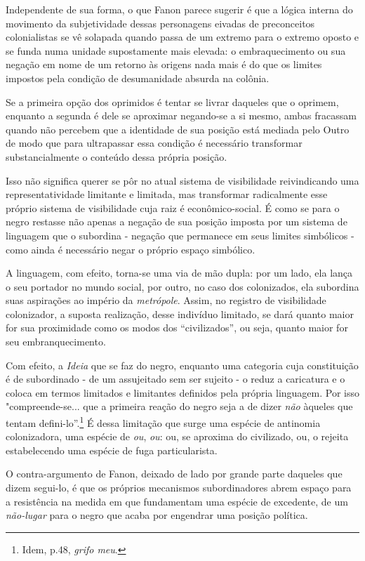 Independente de sua forma, o que Fanon parece sugerir é que a lógica
interna do movimento da subjetividade dessas personagens eivadas de
preconceitos colonialistas se vê solapada quando passa de um extremo
para o extremo oposto e se funda numa unidade supostamente mais elevada:
o embraquecimento ou sua negação em nome de um retorno às origens nada
mais é do que os limites impostos pela condição de desumanidade absurda
na colônia.

Se a primeira opção dos oprimidos é tentar se livrar daqueles que o
oprimem, enquanto a segunda é dele se aproximar negando-se a si mesmo,
ambas fracassam quando não percebem que a identidade de sua posição está
mediada pelo Outro de modo que para ultrapassar essa condição é
necessário transformar substancialmente o conteúdo dessa própria
posição.

Isso não significa querer se pôr no atual sistema de visibilidade
reivindicando uma representatividade limitante e limitada, mas
transformar radicalmente esse próprio sistema de visibilidade cuja raiz
é econômico-social. É como se para o negro restasse não apenas a negação
de sua posição imposta por um sistema de linguagem que o subordina -
negação que permanece em seus limites simbólicos - como ainda é
necessário negar o próprio espaço simbólico.

A linguagem, com efeito, torna-se uma via de mão dupla: por um lado, ela
lança o seu portador no mundo social, por outro, no caso dos
colonizados, ela subordina suas aspirações ao império da
\emph{metrópole}. Assim, no registro de visibilidade colonizador, a
suposta realização, desse indivíduo limitado, se dará quanto maior for
sua proximidade como os modos dos ``civilizados'', ou seja, quanto maior
for seu embranquecimento.

Com efeito, a \emph{Ideia} que se faz do negro, enquanto uma categoria
cuja constituição é de subordinado - de um assujeitado sem ser sujeito -
o reduz a caricatura e o coloca em termos limitados e limitantes
definidos pela própria linguagem. Por isso "compreende-se... que a
primeira reação do negro seja a de dizer \emph{não} àqueles que tentam
defini-lo''.\footnote{Idem, p.48, \emph{grifo meu}.} É dessa limitação
que surge uma espécie de antinomia colonizadora, uma espécie de
\emph{ou}, \emph{ou}: ou, se aproxima do civilizado, ou, o rejeita
estabelecendo uma espécie de fuga particularista.

O contra-argumento de Fanon, deixado de lado por grande parte daqueles
que dizem segui-lo, é que os próprios mecanismos subordinadores abrem
espaço para a resistência na medida em que fundamentam uma espécie de
excedente, de um \emph{não-lugar} para o negro que acaba por engendrar
uma posição política.

